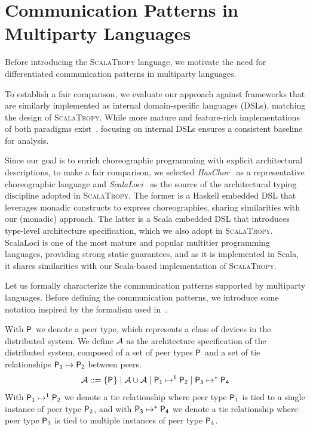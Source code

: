 \documentclass[runningheads]{llncs}
\newcommand{\ourLang}{\textsc{ScalaTropy}}
\newcommand{\diff}[1]{{#1}}
\begin{document}
\section{Communication Patterns in Multiparty Languages}\label{sec:comm-patterns}
Before introducing the \ourLang{} language,
we motivate the need for differentiated communication patterns in multiparty languages.

\diff{To establish a fair comparison,
we evaluate our approach against frameworks that are similarly implemented as internal domain-specific languages (DSLs), matching the design of \ourLang{}.
%
While more mature and feature-rich implementations of both paradigms exist~\cite{10.1145/3632398}, focusing on internal DSLs ensures a consistent baseline for analysis.}

Since our goal is to enrich choreographic programming with explicit architectural descriptions,
to make a fair comparison,
we selected \emph{HasChor}~\cite{10.1145/3607849} \diff{as a representative} choreographic language and \emph{ScalaLoci}~\cite{DBLP:journals/pacmpl/WeisenburgerKS18} \diff{as the source of the architectural typing discipline adopted in \ourLang{}}.
%
The former is a Haskell embedded DSL that leverages monadic constructs to express choreographies,
sharing similarities with our (monadic) approach.
%
The latter is a Scala embedded DSL that introduces type-level architecture specification,
which we also adopt in \ourLang{}.
%
ScalaLoci is one of the most mature and popular multitier programming languages,
providing strong static guarantees,
and as it is implemented in Scala,
it shares similarities with our Scala-based implementation of \ourLang{}.

Let us formally characterize the communication patterns supported by multiparty languages.
%
Before defining the communication patterns,
we introduce some notation inspired by the formalism used in~\cite{DBLP:journals/pacmpl/WeisenburgerKS18}.

With $\pfam$ we denote a peer type, which represents a class of devices in the distributed system.
%
We define $\arch$ as the architecture specification of the distributed system,
composed of a set of peer types $\pfam$ and a set of tie relationships $\tie{\pfam[1]}{\pfam[2]}$ between peers.
\[
\arch ::= \{\pfam\} \;|\; \arch \cup \arch \;|\; \tieSingle{\pfam[1]}{\pfam[2]} \;|\; \tieMult{\pfam[3]}{\pfam[4]}
\]
%
With $\tieSingle{\pfam[1]}{\pfam[2]}$ we denote a tie relationship where peer type $\pfam[1]$ is tied to a single instance of peer type $\pfam[2]$,
and with $\tieMult{\pfam[3]}{\pfam[4]}$ we denote a tie relationship where peer type $\pfam[3]$ is tied to multiple instances of peer type $\pfam[4]$.
\end{document}
